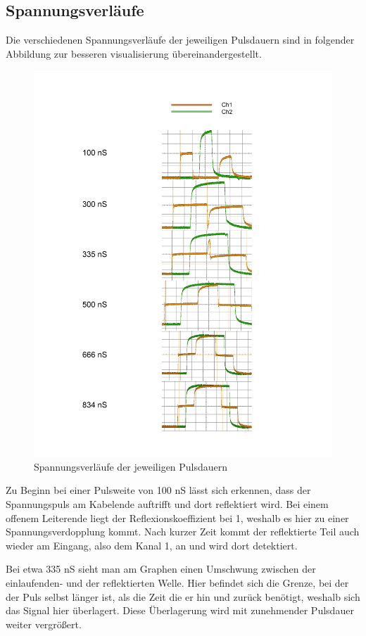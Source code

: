 \documentclass[12pt,a4paper,twoside]{article}
\begin{document}
\subsection{Spannungsverläufe}

Die verschiedenen Spannungsverläufe der jeweiligen Pulsdauern sind in folgender Abbildung zur besseren visualisierung übereinandergestellt.

\begin{figure}[H]
    \centering
    \includegraphics[width=0.7\linewidth]{nudes/A1aAlle.jpg}
    \caption{Spannungsverläufe der jeweiligen Pulsdauern}
    \label{fig:Spannungspulse}
\end{figure}

\noindent
Zu Beginn bei einer Pulsweite von 100 nS lässt sich erkennen, dass der Spannungspuls am Kabelende auftrifft und dort reflektiert wird. 
Bei einem offenem Leiterende liegt der Reflexionskoeffizient bei 1, weshalb es hier zu einer Spannungsverdopplung kommt.
Nach kurzer Zeit kommt der reflektierte Teil auch wieder am Eingang, also dem Kanal 1, an und wird dort detektiert. \newline

\noindent
Bei etwa 335 nS sieht man am Graphen einen Umschwung zwischen der einlaufenden- und der reflektierten Welle.
Hier befindet sich die Grenze, bei der der Puls selbst länger ist, als die Zeit die er hin und zurück benötigt, weshalb sich das Signal hier überlagert.
Diese Überlagerung wird mit zunehmender Pulsdauer weiter vergrößert. \newline
\end{document}
